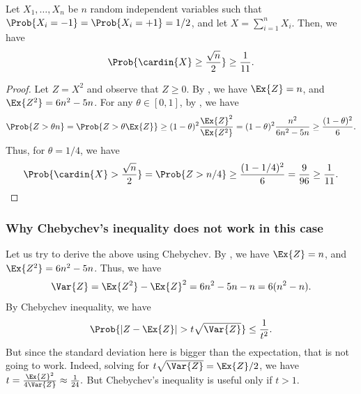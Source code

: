 \begin{lemma}
    Let $X_1, \ldots, X_n$ be $n$ random independent variables such
    that $\Prob{X_i=-1} = \Prob{X_i =+1} = 1/2$, and let
    $X = \sum_{i=1}^n X_i$. Then, we have
    \begin{align*}
      \Prob{\cardin{X} \geq \frac{\sqrt{n}}{2}}
      \geq%
      \frac{1}{11}.
    \end{align*}
\end{lemma}
\begin{proof}
    Let $Z = X^2$ and observe that $Z \geq 0$.  By
    , we have $\Ex{Z} = n$, and
    $\Ex{Z^2} = 6n^2 - 5n$. For any $\theta \in [0,1]$, by
    , we have
    \begin{equation*}
        \Prob{ Z > \theta n}
        =%
        \Prob{Z > \theta \Ex{Z}\bigr.}
        \geq%
        (1-\theta)^2 \frac{\Ex{Z}^2}{\Ex{Z^2}}
        =
        (1-\theta)^2 \frac{n^2}{6n^2 - 5n}
        \geq%
        \frac{(1-\theta)^2}{6}.
    \end{equation*}
    Thus, for $\theta = 1/4$, we have
    \begin{equation*}
        \Prob{\cardin{X} > \frac{\sqrt{n}}{2}}
        =%
        \Prob{ Z > n/4}
        \geq
        \frac{(1-1/4)^2}{6}
        =
        \frac{9}{96}
        \geq
        \frac{1}{11}.
    \end{equation*}
\end{proof}

\subsubsection{Why Chebychev's inequality does not work in this case}

Let us try to derive the above using Chebychev.  By
, we have $\Ex{Z} = n$, and
$\Ex{Z^2} = 6n^2 - 5n$. Thus, we have
\begin{equation*}
    \Var{Z} = \Ex{\smash{Z^2}} - \Ex{Z}^2 = 6n^2 - 5n - n
    =%
    6(n^2 - n).
\end{equation*}
By Chebychev inequality, we have
\begin{equation*}
    \Prob{ |Z - \Ex{Z}| > t \sqrt{\Var{Z}}} \leq \frac{1}{t^2}.
\end{equation*}
But since the standard deviation here is bigger than the expectation,
that is not going to work. Indeed, solving for
$ t \sqrt{\Var{Z}} = \Ex{Z}/2$, we have
\begin{math}
    t = \frac{\Ex{Z}^2}{4\Var{Z}} \approx \frac{1}{24}.
\end{math}
But Chebychev's inequality is useful only if $t > 1$.

